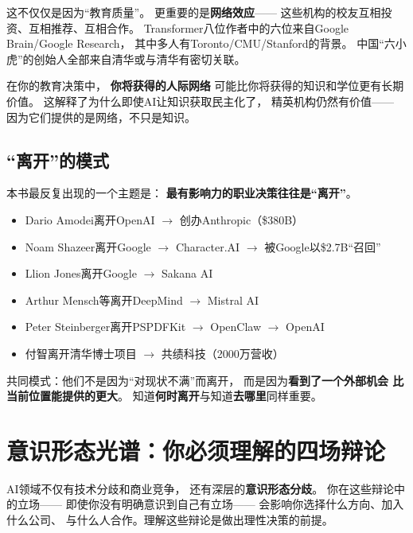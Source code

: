 这不仅仅是因为``教育质量''。
更重要的是\textbf{网络效应}——
这些机构的校友互相投资、互相推荐、互相合作。
Transformer八位作者中的六位来自Google Brain/Google Research，
其中多人有Toronto/CMU/Stanford的背景。
中国``六小虎''的创始人全部来自清华或与清华有密切关联。

\begin{whybox}[网络 vs 学位]
在你的教育决策中，
\textbf{你将获得的人际网络}
可能比你将获得的知识和学位更有长期价值。
这解释了为什么即使AI让知识获取民主化了，
精英机构仍然有价值——
因为它们提供的是网络，不只是知识。
\end{whybox}

\subsection{``离开''的模式}

本书最反复出现的一个主题是：
\textbf{最有影响力的职业决策往往是``离开''}。

\begin{itemize}
  \item Dario Amodei离开OpenAI $\rightarrow$ 创办Anthropic（\$380B）
  \item Noam Shazeer离开Google $\rightarrow$ Character.AI $\rightarrow$ 被Google以\$2.7B``召回''
  \item Llion Jones离开Google $\rightarrow$ Sakana AI
  \item Arthur Mensch等离开DeepMind $\rightarrow$ Mistral AI
  \item Peter Steinberger离开PSPDFKit $\rightarrow$ OpenClaw $\rightarrow$ OpenAI
  \item 付智离开清华博士项目 $\rightarrow$ 共绩科技（2000万营收）
\end{itemize}

共同模式：他们不是因为``对现状不满''而离开，
而是因为\textbf{看到了一个外部机会
比当前位置能提供的更大}。
知道\textbf{何时离开}与知道\textbf{去哪里}同样重要。


\section{意识形态光谱：你必须理解的四场辩论}
\label{sec:fg-ideology}

AI领域不仅有技术分歧和商业竞争，
还有深层的\textbf{意识形态分歧}。
你在这些辩论中的立场——
即使你没有明确意识到自己有立场——
会影响你选择什么方向、加入什么公司、
与什么人合作。理解这些辩论是做出理性决策的前提。


